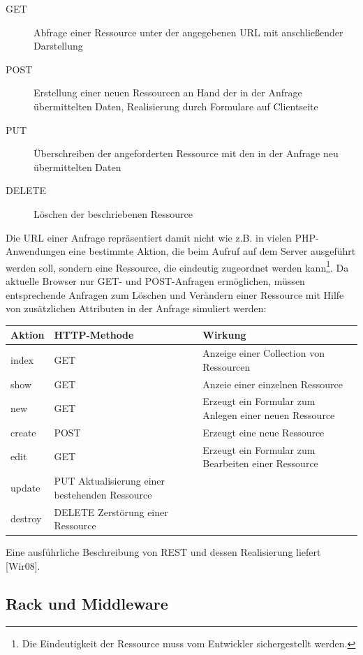 \begin{description}
\item[GET]
Abfrage einer Ressource unter der angegebenen URL mit  anschließender Darstellung
\item[POST]
Erstellung einer neuen Ressourcen an Hand der in der Anfrage übermittelten Daten, Realisierung durch Formulare auf Clientseite
\item[PUT]
Überschreiben der angeforderten Ressource mit den in der Anfrage neu übermittelten Daten
\item[DELETE]
Löschen der beschriebenen Ressource
\end{description}


Die URL einer Anfrage repräsentiert damit nicht wie z.B. in vielen PHP-Anwendungen eine bestimmte Aktion, die beim Aufruf auf dem Server ausgeführt werden soll, sondern eine Ressource, die eindeutig zugeordnet werden kann\footnote{Die Eindeutigkeit der Ressource muss vom Entwickler sichergestellt werden.}.
Da aktuelle Browser nur GET- und POST-Anfragen ermöglichen, müssen entsprechende Anfragen zum Löschen und Verändern einer Ressource mit Hilfe von zusätzlichen Attributen in der Anfrage simuliert werden:


\begin{table}[!h]
\center
\begin{tabular}[!ht]{|l|l|p{6cm}|}
\hline
Aktion & HTTP-Methode & Wirkung\\
\hline
index & GET & Anzeige einer Collection von Ressourcen\\
\hline
show & GET & Anzeie einer einzelnen Ressource\\
\hline
new & GET & Erzeugt ein Formular zum Anlegen einer neuen Ressource\\
\hline
create & POST & Erzeugt eine neue Ressource\\
\hline
edit & GET & Erzeugt ein Formular zum Bearbeiten einer Ressource\\
\hline
update & PUT Aktualisierung einer bestehenden Ressource\\
\hline
destroy & DELETE Zerstörung einer Ressource\\
\hline
\end{tabular}
\end{table}
Eine ausführliche Beschreibung von REST und dessen Realisierung liefert [Wir08].

\subsection{Rack und Middleware}
